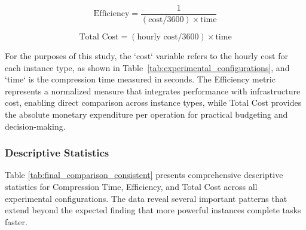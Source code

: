 \documentclass[conference]{IEEEtran}
\begin{document}
	\begin{equation}
		\text{Efficiency} = \frac{1}{(\text{cost}/3600) \times \text{time}}
		\label{eq:efficiency}
	\end{equation}
	
	\begin{equation}
		\text{Total Cost} = (\text{hourly cost}/3600) \times \text{time}
		\label{eq:total_cost}
	\end{equation}
	
	For the purposes of this study, the `cost` variable refers to the hourly cost for each instance type, as shown in Table~\ref{tab:experimental_configurations}, and `time` is the compression time measured in seconds. The Efficiency metric represents a normalized measure that integrates performance with infrastructure cost, enabling direct comparison across instance types, while Total Cost provides the absolute monetary expenditure per operation for practical budgeting and decision-making.
	

	
	\subsubsection{Descriptive Statistics}
	
	Table \ref{tab:final_comparison_consistent} presents comprehensive descriptive statistics for Compression Time, Efficiency, and Total Cost across all experimental configurations. The data reveal several important patterns that extend beyond the expected finding that more powerful instances complete tasks faster.
	
\end{document}
